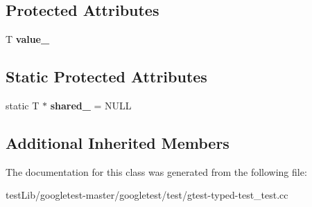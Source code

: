 \subsection*{Protected Attributes}
\begin{DoxyCompactItemize}
\item 
\mbox{\label{classCommonTest_ae59c4abcb833625a7baeb2048531ebec}} 
T {\bfseries value\+\_\+}
\end{DoxyCompactItemize}
\subsection*{Static Protected Attributes}
\begin{DoxyCompactItemize}
\item 
\mbox{\label{classCommonTest_a52368ce1e65a865db9bdccbcc2cedaac}} 
static T $\ast$ {\bfseries shared\+\_\+} = N\+U\+LL
\end{DoxyCompactItemize}
\subsection*{Additional Inherited Members}


The documentation for this class was generated from the following file\+:\begin{DoxyCompactItemize}
\item 
test\+Lib/googletest-\/master/googletest/test/gtest-\/typed-\/test\+\_\+test.\+cc\end{DoxyCompactItemize}
